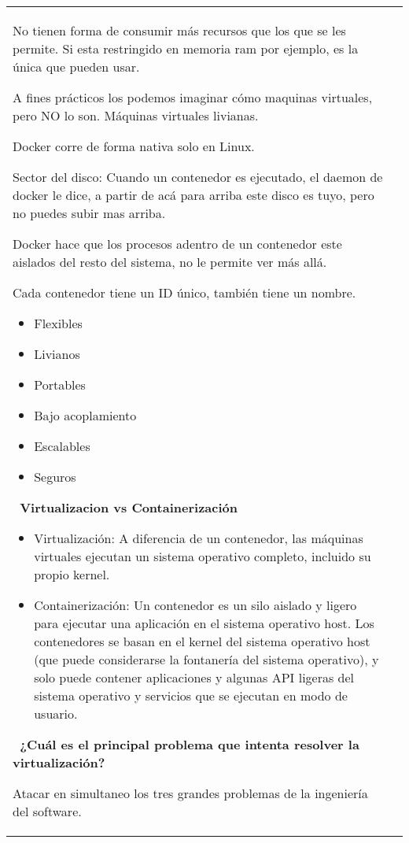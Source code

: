 \documentclass[letterpaper,11pt]{article}
\begin{document}
\begin{tabular*}{7in}{l@{\extracolsep{\fill}}r}
    No tienen forma de consumir más recursos que los que se les permite. Si esta restringido en memoria ram por ejemplo, es la única que pueden usar.
    
    A fines prácticos los podemos imaginar cómo maquinas virtuales, pero NO lo son. Máquinas virtuales livianas.
    
    Docker corre de forma nativa solo en Linux.
    
    Sector del disco: Cuando un contenedor es ejecutado, el daemon de docker le dice, a partir de acá para arriba este disco es tuyo, pero no puedes subir mas arriba.
    
    Docker hace que los procesos adentro de un contenedor este aislados del resto del sistema, no le permite ver más allá.
    
    Cada contenedor tiene un ID único, también tiene un nombre.

    \begin{itemize}
        \item Flexibles
        \item Livianos
        \item Portables
        \item Bajo acoplamiento
        \item Escalables
        \item Seguros
    \end{itemize}
    
    {\bf\ Virtualizacion vs Containerización}
    \begin{itemize}
        \item Virtualización: A diferencia de un contenedor, las máquinas virtuales ejecutan un sistema operativo completo, incluido su propio kernel.
        \item Containerización: Un contenedor es un silo aislado y ligero para ejecutar una aplicación en el sistema operativo host. Los contenedores se basan en el kernel del sistema operativo host (que puede considerarse la fontanería del sistema operativo), y solo puede contener aplicaciones y algunas API ligeras del sistema operativo y servicios que se ejecutan en modo de usuario.
    \end{itemize}
    
    {\bf\ ¿Cuál es el principal problema que intenta resolver la virtualización?}
    
    \par Atacar en simultaneo los tres grandes problemas de la ingeniería del software.
    

\end{tabular*}
\end{document}
